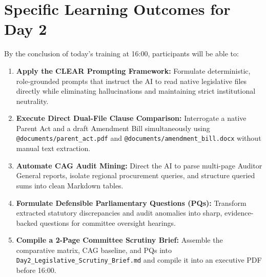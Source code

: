 \documentclass[11pt, a4paper]{report}
\begin{document}
\section{Specific Learning Outcomes for Day 2}
By the conclusion of today's training at 16:00, participants will be able to:
\begin{enumerate}[label=\textbf{2.\arabic*}]
    \item \textbf{Apply the CLEAR Prompting Framework:} Formulate deterministic, role-grounded prompts that instruct the AI to read native legislative files directly while eliminating hallucinations and maintaining strict institutional neutrality.
    \item \textbf{Execute Direct Dual-File Clause Comparison:} Interrogate a native Parent Act and a draft Amendment Bill simultaneously using \texttt{@documents/parent\_act.pdf} and \texttt{@documents/amendment\_bill.docx} without manual text extraction.
    \item \textbf{Automate CAG Audit Mining:} Direct the AI to parse multi-page Auditor General reports, isolate regional procurement queries, and structure queried sums into clean Markdown tables.
    \item \textbf{Formulate Defensible Parliamentary Questions (PQs):} Transform extracted statutory discrepancies and audit anomalies into sharp, evidence-backed questions for committee oversight hearings.
    \item \textbf{Compile a 2-Page Committee Scrutiny Brief:} Assemble the comparative matrix, CAG baseline, and PQs into \texttt{Day2\_Legislative\_Scrutiny\_Brief.md} and compile it into an executive PDF before 16:00.
\end{enumerate}
\end{document}
